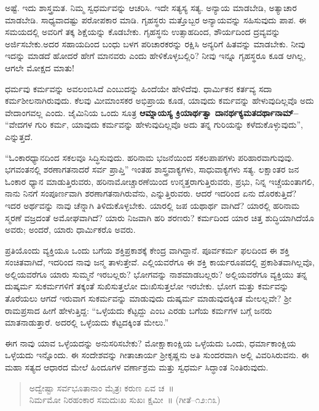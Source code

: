 ಅಷ್ಟೆ. ಇದು ಶಾಸ್ತ್ರಮತ. ನಿಮ್ಮ ಸ್ವಧರ್ಮವನ್ನು ಆಚರಿಸಿ. ಇದೇ ಸತ್ಯಸ್ಯ ಸತ್ಯ. ಅನ್ಯಾಯ ಮಾಡಬೇಡಿ, ಅತ್ಯಾಚಾರ ಮಾಡಬೇಡಿ. ಸಾಧ್ಯವಾದಷ್ಟು ಪರೋಪಕಾರ ಮಾಡಿ. ಗೃಹಸ್ಥರು ಮತ್ತೊಬ್ಬರ ಅನ್ಯಾಯವನ್ನು ಸಹಿಸುವುದು ಪಾಪ. ಈ ಸಮಯದಲ್ಲಿ ಅವರಿಗೆ ತಕ್ಕ ಶಿಕ್ಷೆಯನ್ನು ಕೊಡಬೇಕು. ಗೃಹಸ್ಥನು ಉತ್ಸಾಹದಿಂದ, ಶೌರ್ಯದಿಂದ ದ್ರವ್ಯವನ್ನು ಅರ್ಜಿಸಬೇಕು.ಅದರ ಸಹಾಯದಿಂದ ಬಂಧು ಬಳಗ ಪರಿಚಾರಕರನ್ನು ರಕ್ಷಿಸಿ ಅನ್ಯರಿಗೆ ಹಿತವನ್ನು ಮಾಡಬೇಕು. ನೀವು ಇದನ್ನು ಮಾಡದೆ ಹೋದರೆ ಹೇಗೆ ಮಾನವರು ಎಂದು ಹೇಳಿಕೊಳ್ಳಬಲ್ಲಿರಿ? ನೀವು ಇನ್ನೂ ಗೃಹಸ್ಥರೂ ಕೂಡ ಆಗಿಲ್ಲ, ಆಗಲೇ ಮೋಕ್ಷದ ಮಾತು!

ಧರ್ಮವು ಕರ್ಮವನ್ನು ಅವಲಂಬಿಸಿದೆ ಎಂಬುದನ್ನು ಹಿಂದೆಯೇ ಹೇಳಿದೆವು. ಧಾರ್ಮಿ\break ಕನ ಕರ್ತವ್ಯ ಸದಾ ಕರ್ಮಶೀಲನಾಗಿರುವುದು. ಕೆಲವು ಮೀಮಾಂಸಕರ ಅಭಿಪ್ರಾಯ ಕೂಡ, ಯಾವುದು ಕರ್ಮವನ್ನು ಹೇಳುವುದಿಲ್ಲವೊ ಅದು ವೇದಾಂಗವಲ್ಲ ಎಂದು. ಜೈಮಿನಿಯ ಒಂದು ಸೂತ್ರ \textbf{ಆಮ್ನಾಯಸ್ಯ ಕ್ರಿಯಾರ್ಥತ್ವಾ ದಾನರ್ಥಕ್ಯಮತದರ್ಥಾನಾಮ್​–} “ವೇದಗಳ ಗುರಿ ಕರ್ಮ, ಯಾವುದು ಕರ್ಮವನ್ನು ಹೇಳುವುದಿಲ್ಲವೊ ಅದು ತನ್ನ ಗುರಿಯನ್ನು ಕಳೆದುಕೊಳ್ಳುವುದು”, ಎನ್ನುತ್ತದೆ.

“ಓಂಕಾರಧ್ಯಾನದಿಂದ ಸಕಲವೂ ಸಿದ್ಧಿಸುವುದು. ಹರಿನಾಮ ಭಜನೆಯಿಂದ ಸಕಲ\break ಪಾಪಗಳು ಪರಿಹಾರವಾಗುವುವು. ಭಗವಂತನಲ್ಲಿ ಶರಣಾಗತನಾದರೆ ಸರ್ವ ಪ್ರಾಪ್ತಿ” ಇಂತಹ ಶಾಸ್ತ್ರವಾಕ್ಯಗಳು, ಸಾಧುವಾಕ್ಯಗಳು ಸತ್ಯ. ಲಕ್ಷಾಂತರ ಜನ ಓಂಕಾರ ಧ್ಯಾನ ಮಾಡುತ್ತಿರುವರು, ಹರಿನಾಮೋಚ್ಚಾರಣೆಯಿಂದ ಉನ್ಮತ್ತರಾಗುತ್ತಿರುವರು, ಪ್ರಭು, ನಿನ್ನ ಇಚ್ಚೆಯಂತಾಗಲಿ, ನಾನು ನಿನಗೆ ಸಂಪೂರ್ಣವಾಗಿ ಶರಣಾಗತನಾಗಿರುವೆನು, ಎನ್ನುತ್ತಿರುವರು. ಆದರೆ ಇದರಿಂದ ಏನು ದೊರಕುತ್ತಿದೆ? ಇದರ ಅರ್ಥವನ್ನು ನಾವು ಚೆನ್ನಾಗಿ ತಿಳಿದುಕೊಳ್ಳಬೇಕು. ಯಾರಲ್ಲಿ ಜಪ ಯಥಾರ್ಥ ವಾಗಿದೆ? ಯಾರಲ್ಲಿ ಹರಿನಾಮ ಸ್ಮರಣೆ ವಜ್ರದಂತೆ ಅಮೋಘವಾಗಿದೆ? ಯಾರು ನಿಜವಾಗಿ ಹರಿ ಶರಣರು? ಕರ್ಮದಿಂದ ಯಾರ ಚಿತ್ತ ಶುದ್ಧಿಯಾಗಿದೆಯೊ ಅವರು; ಅಂದರೆ, ಯಾರು ಧಾರ್ಮಿಕರೊ ಅವರು.

ಪ್ರತಿಯೊಂದು ವ್ಯಕ್ತಿಯೂ ಒಂದು ಬಗೆಯ ಶಕ್ತಿಪ್ರಕಾಶಕ್ಕೆ ಕೇಂದ್ರ ವಾಗಿದ್ದಾನೆ. ಪೂರ್ವಕರ್ಮ ಫಲದಿಂದ ಈ ಶಕ್ತಿ ಸಂಚಿತವಾಗಿದೆ, ಇದರಿಂದ ನಾವು ಜನ್ಮ ತಾಳುತ್ತೇವೆ. ಎಲ್ಲಿಯವರೆಗೂ ಈ ಶಕ್ತಿ ಕಾರ್ಯರೂಪದಲ್ಲಿ ಪ್ರಕಾಶಿತವಾಗಿಲ್ಲವೊ, ಅಲ್ಲಿಯವರೆಗೂ ಯಾರು ಸುಮ್ಮನೆ ಇರಬಲ್ಲರು? ಭೋಗವನ್ನು ನಾಶಮಾಡಬಲ್ಲರು? ಅಲ್ಲಿಯವರೆಗೂ ವ್ಯಕ್ತಿಯು ತನ್ನ ದುಷ್ಕರ್ಮ ಸುಕರ್ಮಗಳಿಗೆ ತಕ್ಕಂತೆ ಸುಖಿಸುತ್ತಲೋ ದುಃಖಿಸುತ್ತಲೋ ಇರಬೇಕು. ಭೋಗ ಮತ್ತು ಕರ್ಮವನ್ನು ತೊರೆಯಲು ಆಗದೆ ಇರುವಾಗ ಸುಕರ್ಮವನ್ನು ಮಾಡುವುದು ದುಷ್ಕರ್ಮ ಮಾಡುವುದಕ್ಕಿಂತ ಮೇಲಲ್ಲವೇ? ಶ‍್ರೀ ರಾಮಪ್ರಸಾದ ಹೀಗೆ ಹೇಳುತ್ತಿದ್ದ: “ಒಳ್ಳೆಯದು ಕೆಟ್ಟದ್ದು ಎಂಬ ಎರಡು ಬಗೆಯ ಕರ್ಮಗಳ ಬಗ್ಗೆ ಜನರು ಮಾತನಾಡುತ್ತಾರೆ. ಅದರಲ್ಲಿ ಒಳ್ಳೆಯದು ಕೆಟ್ಟದಕ್ಕಿಂತ ಮೇಲು.”

ಈಗ ನಾವು ಯಾವ ಒಳ್ಳೆಯದನ್ನು ಅನುಸರಿಸಬೇಕು? ಮೋಕ್ಷಾಕಾಂಕ್ಷಿಯ ಒಳ್ಳೆಯದು ಒಂದು, ಧರ್ಮಾಕಾಂಕ್ಷಿಯ ಒಳ್ಳೆಯದು ಇನ್ನೊಂದು. ಈ ಸಂದೇಶವನ್ನು ಗೀತಾಚಾರ್ಯ ಶ‍್ರೀಕೃಷ್ಣನು ಅತಿ ಸುಂದರವಾಗಿ ಅಲ್ಲಿ ವಿವರಿಸಿರುವನು. ಈ ಮಹಾ ಸತ್ಯದ ಆಧಾರದ ಮೇಲೆ ಹಿಂದೂಗಳ ವರ್ಣಾಶ್ರಮ ಮತ್ತು ಸ್ವಧರ್ಮ ಸಿದ್ಧಾಂತ ನಿಂತಿರುವುದು.

\begin{verse}
ಅದ್ವೇಷ್ಟಾ ಸರ್ವಭೂತಾನಾಂ ಮೈತ್ರಃ ಕರುಣ ಏವ ಚ~॥\\ನಿರ್ಮಮೋ ನಿರಹಂಕಾರ ಸಮದುಃಖ ಸುಖಃ ಕ್ಷಮೀ~॥ (ಗೀತೆ–೧೨:೧೩)
\end{verse}

